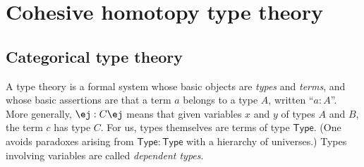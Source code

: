 \documentclass[copyright]{eptcs}
\makeatletter
\newcommand{\type}{\ensuremath{\mathsf{Type}}\xspace}
\def\jd#1{\@jd#1\ej}
\def\@jd#1|-#2\ej{\@@jd#1,,\;\vdash\;\left(#2\right)}
\def\@@jd#1,{\@ifmtarg{#1}{\let\next=\relax}{\left(#1\right)\let\next=\@@@jd}\next}
\def\@@@jd#1,{\@ifmtarg{#1}{\let\next=\relax}{,\,\left(#1\right)\let\next=\@@@jd}\next}
\makeatother
\begin{document}
\section{Cohesive homotopy type theory}
\label{sec:cohott}

\subsection{Categorical type theory}
\label{sec:type-theory}

A type theory is a formal system
whose basic objects are \emph{types} and \emph{terms},
and whose basic assertions are that a term $a$ belongs to a type $A$, written ``$a:A$''.
%
More generally, $\jd{x:A, y:B |- c:C}$ means that given variables $x$ and $y$ of types $A$ and $B$, the term $c$ has type $C$.
%
For us,
types themselves are terms of type \type.
(One avoids paradoxes arising from $\type:\type$ with a hierarchy of universes.)
%
%
Types involving variables are called \emph{dependent types}.
\end{document}
